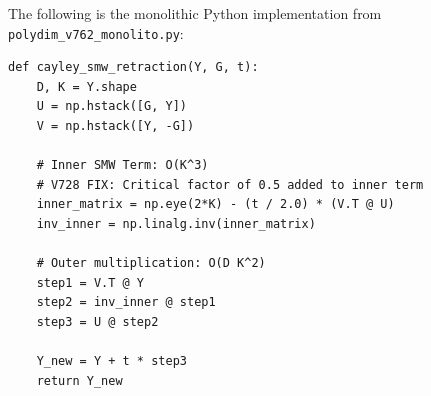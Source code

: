 The following is the monolithic Python implementation from \texttt{polydim\_v762\_monolito.py}:

\begin{verbatim}
def cayley_smw_retraction(Y, G, t):
    D, K = Y.shape
    U = np.hstack([G, Y])
    V = np.hstack([Y, -G])
    
    # Inner SMW Term: O(K^3)
    # V728 FIX: Critical factor of 0.5 added to inner term
    inner_matrix = np.eye(2*K) - (t / 2.0) * (V.T @ U)
    inv_inner = np.linalg.inv(inner_matrix)
    
    # Outer multiplication: O(D K^2)
    step1 = V.T @ Y
    step2 = inv_inner @ step1
    step3 = U @ step2
    
    Y_new = Y + t * step3
    return Y_new
\end{verbatim}